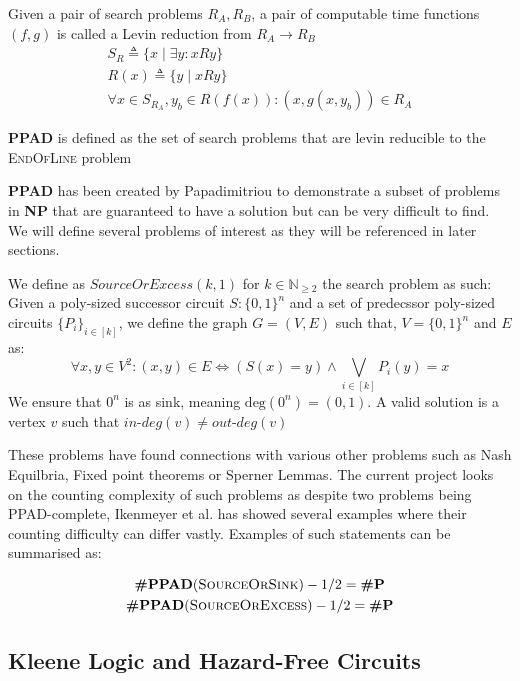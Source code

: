 \begin{definition}
    Given a pair of search problems $R_A, R_B$, a pair of
    computable time functions $(f,g)$ is called a Levin reduction from $R_A \to R_B$
    \begin{gather*}
        S_R \triangleq \{x \mid \exists y : xRy  \}\\
        R(x) \triangleq \{y \mid x Ry \} \\
        \forall x \in S_{R_A}, y_b \in R(f(x)):  (x , g(x, y_b)) \in R_A
    \end{gather*}
\end{definition}

\begin{definition}
    \textbf{PPAD} is defined as the set of search problems that
    are levin reducible to the \textsc{EndOfLine} problem
\end{definition}


\textbf{PPAD} has been created by Papadimitriou \cite{papadimitriouComplexityParityArgument1994}
to demonstrate a subset of problems in \textbf{NP} that are guaranteed to have
a solution but can be very difficult to find. We will define
several problems of interest as they will be referenced in later sections.

\begin{definition}
    We define as $\textit{SourceOrExcess}(k,1)$ for $k \in \mathbb{N}_{\geq 2}$
    the search problem as such: Given a poly-sized successor circuit $S : \{0,1\}^n$
    and a set of predecssor poly-sized circuits $\{P_i\}_{i \in [k]}$, we define
    the graph $G = (V,E)$ such that, $V = \{0,1\}^n$ and $E$ as:
    $$
    \forall x, y \in V^2: (x,y) \in E \iff (S(x) = y) \wedge \bigvee_{i \in [k]} P_i(y) = x
    $$
    We ensure that $0^n$ is as sink, meaning $\text{deg}(0^n) = (0,1)$.
    A valid solution is a vertex $v$ such that $\textit{in-deg}(v) \neq \textit{out-deg}(v)$
\end{definition}




\begin{definition}
\end{definition}







These problems have found
connections with various other problems such as Nash Equilbria,
Fixed point theorems or Sperner Lemmas. The current project looks
on the counting complexity of such problems as despite two problems
being PPAD-complete, Ikenmeyer et al. has showed several examples where
their counting difficulty can differ vastly. Examples of such statements
can be summarised as:

\begin{gather*}
    \textbf{\#PPAD}(\textsc{SourceOrSink})-1/2  = \textbf{\#P}\\
    \textbf{\#PPAD}(\textsc{SourceOrExcess})-1/2  = \textbf{\#P}\\
\end{gather*} 


\subsection{Kleene Logic and Hazard-Free Circuits}



